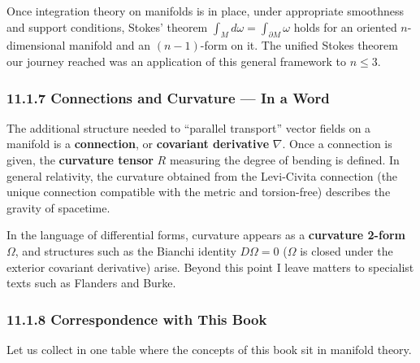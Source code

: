 Once integration theory on manifolds is in place, under appropriate
smoothness and support conditions, Stokes' theorem
\(\int_M d\omega = \int_{\partial M} \omega\) holds for an oriented
\(n\)-dimensional manifold and an \((n-1)\)-form on it. The unified
Stokes theorem our journey reached was an application of this general
framework to \(n \le 3\).

\hypertarget{connections-and-curvature-in-a-word}{%
\subsubsection{11.1.7 Connections and Curvature --- In a
Word}\label{connections-and-curvature-in-a-word}}

The additional structure needed to ``parallel transport'' vector fields
on a manifold is a \textbf{connection}, or \textbf{covariant derivative}
\(\nabla\). Once a connection is given, the \textbf{curvature tensor}
\(R\) measuring the degree of bending is defined. In general relativity,
the curvature obtained from the Levi-Civita connection (the unique
connection compatible with the metric and torsion-free) describes the
gravity of spacetime.

In the language of differential forms, curvature appears as a
\textbf{curvature 2-form} \(\Omega\), and structures such as the Bianchi
identity \(D\Omega = 0\) (\(\Omega\) is closed under the exterior
covariant derivative) arise. Beyond this point I leave matters to
specialist texts such as Flanders and Burke.

\hypertarget{correspondence-with-this-book}{%
\subsubsection{11.1.8 Correspondence with This
Book}\label{correspondence-with-this-book}}

Let us collect in one table where the concepts of this book sit in
manifold theory.

